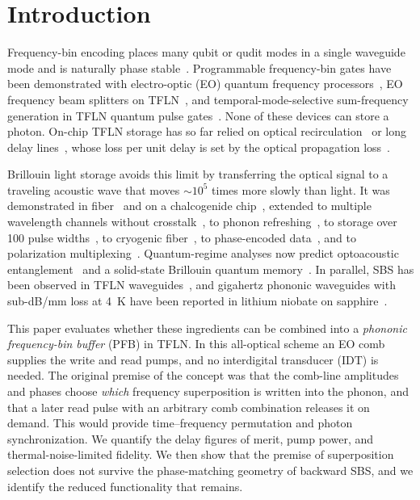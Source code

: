 \documentclass[reprint,amsmath,amssymb,aps,prapplied,superscriptaddress,floatfix]{revtex4-2}
\begin{document}
\section{Introduction}
Frequency-bin encoding places many qubit or qudit modes in a single waveguide mode and is naturally phase stable~\cite{Lu2023Review}. Programmable frequency-bin gates have been demonstrated with electro-optic (EO) quantum frequency processors~\cite{LukensLougovski2017,Lu2018PRL}, EO frequency beam splitters on TFLN~\cite{Hu2021Nature,Yang2026QFP}, and temporal-mode-selective sum-frequency generation in TFLN quantum pulse gates~\cite{Babel2026QPG}. None of these devices can store a photon. On-chip TFLN storage has so far relied on optical recirculation~\cite{Ekici2023} or long delay lines~\cite{Song2023ODL}, whose loss per unit delay is set by the optical propagation loss~\cite{ZhuX2024PRJ,ShamsAnsari2022}.

Brillouin light storage avoids this limit by transferring the optical signal to a traveling acoustic wave that moves $\sim 10^5$ times more slowly than light. It was demonstrated in fiber~\cite{ZhuGauthierBoyd2007} and on a chalcogenide chip~\cite{Merklein2017}, extended to multiple wavelength channels without crosstalk~\cite{Stiller2019}, to phonon refreshing~\cite{Stiller2020}, to storage over 100 pulse widths~\cite{Stiller2024}, to cryogenic fiber~\cite{Geilen2024}, to phase-encoded data~\cite{Saffer2025}, and to polarization multiplexing~\cite{Zeng2026}. Quantum-regime analyses now predict optoacoustic entanglement~\cite{ZhuGenesStiller2024} and a solid-state Brillouin quantum memory~\cite{ZhuGenesStiller2026}. In parallel, SBS has been observed in TFLN waveguides~\cite{Ye2023SAW,Ye2025SciAdv,Rodrigues2025,Haerteis2025}, and gigahertz phononic waveguides with sub-dB/mm loss at 4~K have been reported in lithium niobate on sapphire~\cite{Mayor2021}.

This paper evaluates whether these ingredients can be combined into a \emph{phononic frequency-bin buffer} (PFB) in TFLN. In this all-optical scheme an EO comb supplies the write and read pumps, and no interdigital transducer (IDT) is needed. The original premise of the concept was that the comb-line amplitudes and phases choose \emph{which} frequency superposition is written into the phonon, and that a later read pulse with an arbitrary comb combination releases it on demand. This would provide time--frequency permutation and photon synchronization. We quantify the delay figures of merit, pump power, and thermal-noise-limited fidelity. We then show that the premise of superposition selection does not survive the phase-matching geometry of backward SBS, and we identify the reduced functionality that remains.
\end{document}
